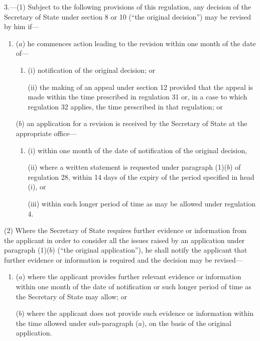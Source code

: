 \documentclass[12pt,a4paper]{article}
\begin{document}
3.—(1) Subject to the following provisions of this regulation, any decision of the Secretary of State under section 8 or 10 (“the original decision”) may be revised by him if—
\begin{enumerate}\item[]

($a$) he commences action leading to the revision within one month of the date of—
\begin{enumerate}\item[]
(i) notification of the original decision; or

(ii) the making of an appeal under section 12 provided that the appeal is made within the time prescribed in regulation 31 or, in a case to which regulation 32 applies, the time prescribed in that regulation; or
\end{enumerate}

($b$) an application for a revision is received by the Secretary of State at the appropriate office—
\begin{enumerate}\item[]
(i) within one month of the date of notification of the original decision,

(ii) where a written statement is requested under paragraph (1)($b$) of regulation 28, within 14 days of the expiry of the period specified in head (i), or

(iii) within such longer period of time as may be allowed under regulation 4.
\end{enumerate}
\end{enumerate}

(2) Where the Secretary of State requires further evidence or information from the applicant in order to consider all the issues raised by an application under paragraph (1)($b$) (“the original application”), he shall notify the applicant that further evidence or information is required and the decision may be revised—
\begin{enumerate}\item[]
($a$) where the applicant provides further relevant evidence or information within one month of the date of notification or such longer period of time as the Secretary of State may allow; or

($b$) where the applicant does not provide such evidence or information within the time allowed under sub-paragraph ($a$), on the basis of the original application.
\end{enumerate}
\end{document}
